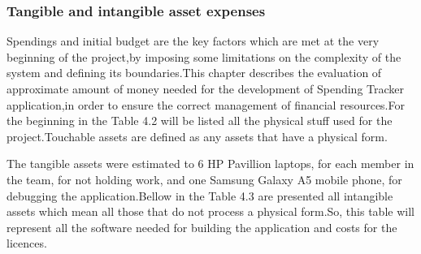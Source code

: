 \subsubsection{Tangible and intangible asset expenses}
Spendings and initial budget are the key factors which are met at the very beginning of the project,by imposing some limitations on the complexity of the system and defining its boundaries.This chapter describes the evaluation of approximate amount of money needed for the development of Spending Tracker application,in order to ensure the correct management of financial resources.For the beginning in the Table 4.2 will be listed all the physical stuff used for the project.Touchable assets are defined as any assets that have a physical form.
\begin{table}[H]
	\centering
	\caption{Tangible assets}
	\label{Tangible assets}
\end{table}
The tangible assets were estimated to 6 HP Pavillion laptops, for each member in the team, for not holding work, and one Samsung Galaxy A5 mobile phone, for debugging the application.Bellow in the Table 4.3 are presented all intangible assets which mean all those that do not process a physical form.So, this table will represent all the software needed for building the application and costs for the licences.
\begin{table}[H]
	\centering
	\caption{Intangible assets}
	\label{Intangible assets}
\end{table}
